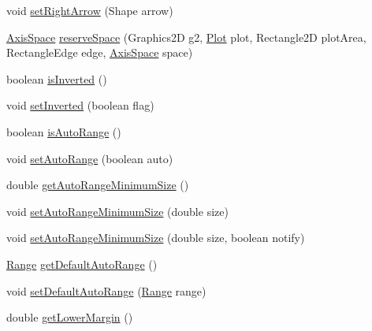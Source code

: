 \begin{DoxyCompactItemize}
\item 
void \mbox{\hyperlink{classorg_1_1jfree_1_1chart_1_1axis_1_1_value_axis_a8d44ab4ca98d13a775770b10de454825}{set\+Right\+Arrow}} (Shape arrow)
\item 
\mbox{\hyperlink{classorg_1_1jfree_1_1chart_1_1axis_1_1_axis_space}{Axis\+Space}} \mbox{\hyperlink{classorg_1_1jfree_1_1chart_1_1axis_1_1_value_axis_a0566b6ca64c4e38e3cd24a38e01c7af7}{reserve\+Space}} (Graphics2D g2, \mbox{\hyperlink{classorg_1_1jfree_1_1chart_1_1plot_1_1_plot}{Plot}} plot, Rectangle2D plot\+Area, Rectangle\+Edge edge, \mbox{\hyperlink{classorg_1_1jfree_1_1chart_1_1axis_1_1_axis_space}{Axis\+Space}} space)
\item 
boolean \mbox{\hyperlink{classorg_1_1jfree_1_1chart_1_1axis_1_1_value_axis_a61493fa28db9f869172d67b1205e2793}{is\+Inverted}} ()
\item 
void \mbox{\hyperlink{classorg_1_1jfree_1_1chart_1_1axis_1_1_value_axis_af1d2e514f72c75bab68872d87ad9ee50}{set\+Inverted}} (boolean flag)
\item 
boolean \mbox{\hyperlink{classorg_1_1jfree_1_1chart_1_1axis_1_1_value_axis_a6387bb31d194a542d27329ae8e0e84b2}{is\+Auto\+Range}} ()
\item 
void \mbox{\hyperlink{classorg_1_1jfree_1_1chart_1_1axis_1_1_value_axis_a2407eb22460d462c3eb730d5ddb10067}{set\+Auto\+Range}} (boolean auto)
\item 
double \mbox{\hyperlink{classorg_1_1jfree_1_1chart_1_1axis_1_1_value_axis_a226a4b8af4f659deaaf5e1dade76533b}{get\+Auto\+Range\+Minimum\+Size}} ()
\item 
void \mbox{\hyperlink{classorg_1_1jfree_1_1chart_1_1axis_1_1_value_axis_a70efada90ae6f8ed6f4cc34052adec3f}{set\+Auto\+Range\+Minimum\+Size}} (double size)
\item 
void \mbox{\hyperlink{classorg_1_1jfree_1_1chart_1_1axis_1_1_value_axis_a7da4ee922ece37d540898cacf8b5bdae}{set\+Auto\+Range\+Minimum\+Size}} (double size, boolean notify)
\item 
\mbox{\hyperlink{classorg_1_1jfree_1_1data_1_1_range}{Range}} \mbox{\hyperlink{classorg_1_1jfree_1_1chart_1_1axis_1_1_value_axis_a37169f8d6ba2253f608421b4af73155c}{get\+Default\+Auto\+Range}} ()
\item 
void \mbox{\hyperlink{classorg_1_1jfree_1_1chart_1_1axis_1_1_value_axis_aa226504260af86620b2adac63cf2a7c8}{set\+Default\+Auto\+Range}} (\mbox{\hyperlink{classorg_1_1jfree_1_1data_1_1_range}{Range}} range)
\item 
double \mbox{\hyperlink{classorg_1_1jfree_1_1chart_1_1axis_1_1_value_axis_aad1a68a143582b583b76f5b632014f50}{get\+Lower\+Margin}} ()

\end{DoxyCompactItemize}
